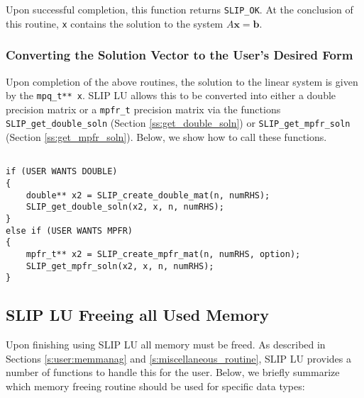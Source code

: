 \documentclass[11pt]{article}
\theoremstyle{definition}
\begin{document}
Upon successful completion, this function returns \verb|SLIP_OK|. At the conclusion of this routine, \verb|x| contains the solution to the system $A \mathbf{x} = \mathbf{b}$.

\subsubsection{Converting the Solution Vector to the User's Desired Form}

Upon completion of the above routines, the solution to the linear system is given by the \verb|mpq_t** x|. SLIP LU allows this to be converted into either a double precision matrix or a \verb|mpfr_t| precision matrix via the functions \verb|SLIP_get_double_soln| (Section \ref{ss:get_double_soln}) or \verb|SLIP_get_mpfr_soln| (Section \ref{ss:get_mpfr_soln}). Below, we show how to call these functions.

\begin{verbatim}

if (USER WANTS DOUBLE)
{
    double** x2 = SLIP_create_double_mat(n, numRHS);
    SLIP_get_double_soln(x2, x, n, numRHS);
}
else if (USER WANTS MPFR)
{
    mpfr_t** x2 = SLIP_create_mpfr_mat(n, numRHS, option);
    SLIP_get_mpfr_soln(x2, x, n, numRHS);
}

\end{verbatim}


\cprotect\subsection{SLIP LU Freeing all Used Memory} \label{s:Using:free}

Upon finishing using SLIP LU all memory must be freed. As described in Sections \ref{s:user:memmanag} and \ref{s:miscellaneous_routine}, SLIP LU provides a number of functions to handle this for the user. Below, we briefly summarize which memory freeing routine should be used for specific data types:
\end{document}
